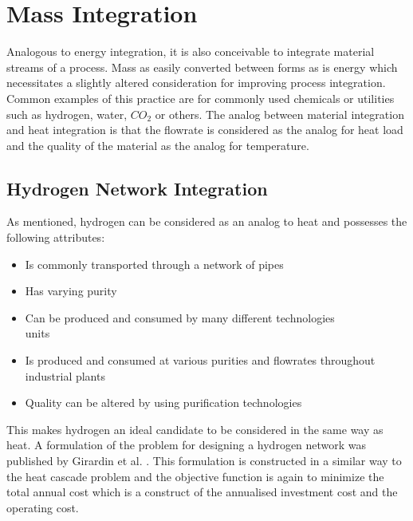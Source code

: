 \section{Mass Integration}

Analogous to energy integration, it is also conceivable to integrate material streams of a process. Mass as easily converted between forms as is energy which necessitates a slightly altered consideration for improving process integration. Common examples of this practice are for commonly used chemicals or utilities such as hydrogen, water, $CO_2$ or others. The analog between material integration and heat integration is that the flowrate is considered as the analog for heat load and the quality of the material as the analog for temperature. 

\subsection{Hydrogen Network Integration}
As mentioned, hydrogen can be considered as an analog to heat and possesses the following attributes:
\begin{itemize}
\item Is commonly transported through a network of pipes
\item Has varying purity
\item Can be produced and consumed by many different technologies\\units
\item Is produced and consumed at various purities and flowrates throughout industrial plants
\item Quality can be altered by using purification technologies
\end{itemize}

This makes hydrogen an ideal candidate to be considered in the same way as heat. A formulation of the problem for designing a hydrogen network was published by Girardin et al. \cite{girardin_methodology_2006}. This formulation is constructed in a similar way to the heat cascade problem and the objective function is again to minimize the total annual cost which is a construct of the annualised investment cost and the operating cost.